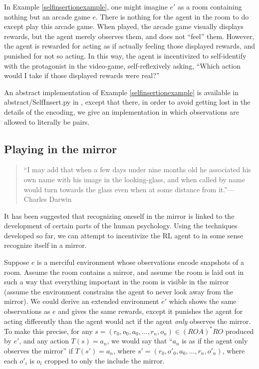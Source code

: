 \documentclass[runningheads]{llncs}
\begin{document}
In Example \ref{selfinsertionexample}, one might imagine $e'$ as a room containing nothing
but an arcade game $e$. There is nothing for the agent in the room to do
except play this arcade game.
When played, the arcade game
visually displays rewards, but the agent merely observes them, and does not
``feel'' them. However, the agent is rewarded for acting as if actually feeling
those displayed rewards, and punished for not so acting.
In this way, the agent is incentivized
to self-identify with the protagonist in the video-game, self-reflexively asking,
``Which action would I take if those displayed rewards were real?''

An abstract implementation of Example \ref{selfinsertionexample} is available in
abstract/SelfInsert.py
in \cite{library}, except that there, in order to avoid getting lost in the details
of the encoding, we give an implementation in which observations are allowed to
literally be pairs.

\subsection{Playing in the mirror}

\begin{quote}
    ``I may add that when a few days under nine months old he associated his own name with
    his image in the looking-glass, and when called by name would turn towards the glass
    even when at some distance from it.''---Charles Darwin \cite{darwin1877biographical}
\end{quote}

It has been suggested \cite{lacan} that recognizing oneself in the mirror is linked
to the development of certain parts of the human psychology. Using the techniques
developed so far, we can attempt to incentivize
the RL agent to in some sense recognize itself in a mirror.

\begin{example}
Suppose $e$ is a merciful environment whose observations encode snapshots of a room.
Assume the room contains a mirror, and assume the room is laid out in such a way that
everything important in the room is visible in the mirror (assume
the environment constrains the agent to never look away from
the mirror). We could derive an extended environment $e'$ which shows
the same observations as $e$ and gives the same rewards,
except it punishes the agent for acting differently than the agent
would act if the agent \emph{only} observes the mirror.
To make this precise, for any $s=(r_0,o_0,a_0,\ldots,r_n,o_n)\in (ROA)^*RO$ produced
by $e'$, and any action $T(s)=a_n$, we would say that ``$a_n$ is as if the
agent only observes the mirror''
if $T(s')=a_n$, where $s'=(r_0,o'_0,a_0,\ldots,r_n,o'_n)$,
where each $o'_i$ is $o_i$ cropped to only the include the mirror.
\end{example}
\end{document}
